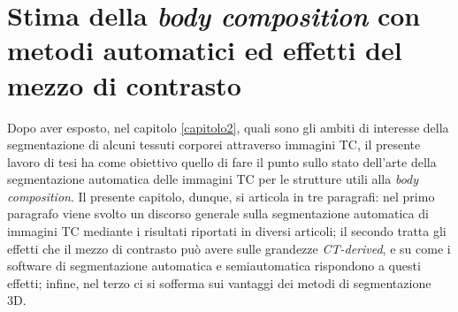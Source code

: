 \chapter{Stima della \textit{body composition} con metodi automatici ed effetti del mezzo di contrasto}
Dopo aver esposto, nel capitolo \ref{capitolo2}, quali sono gli ambiti di interesse della segmentazione di alcuni tessuti corporei attraverso immagini TC, il presente lavoro di tesi ha come obiettivo quello di fare il punto sullo stato dell'arte della segmentazione automatica delle immagini TC per le strutture utili alla \textit{body composition}. Il presente capitolo, dunque, si articola in tre paragrafi: nel primo paragrafo viene svolto un discorso generale sulla segmentazione automatica di immagini TC mediante i risultati riportati in diversi articoli; il secondo tratta gli effetti che il mezzo di contrasto può avere sulle grandezze \textit{CT-derived}, e su come i software di segmentazione automatica e semiautomatica rispondono a questi effetti; infine, nel terzo ci si sofferma sui vantaggi dei metodi di segmentazione 3D.


